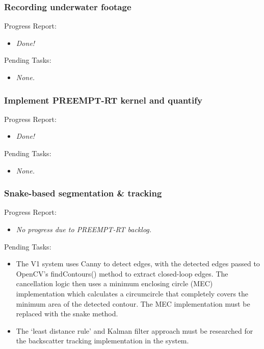 \subsubsection{Recording underwater footage}

Progress Report:

\begin{itemize}
    \item \textit{Done!}
\end{itemize}

Pending Tasks:

\begin{itemize}
    \item \textit{None.}
\end{itemize}




\subsubsection{Implement PREEMPT-RT kernel and quantify}

Progress Report:

\begin{itemize}
    \item \textit{Done!}
\end{itemize}

Pending Tasks:

\begin{itemize}
    \item \textit{None.}
\end{itemize}






\subsubsection{Snake-based segmentation \& tracking}

Progress Report:

\begin{itemize}
    \item \textit{No progress due to PREEMPT-RT backlog.}
\end{itemize}

Pending Tasks:

\begin{itemize}
    \item The V1 system uses Canny to detect edges, with the detected edges passed to OpenCV's findContours() method to extract closed-loop edges. The cancellation logic then uses a minimum enclosing circle (MEC) implementation which calculates a circumcircle that completely covers the minimum area of the detected contour. The MEC implementation must be replaced with the snake method.
    \item The `least distance rule' and Kalman filter approach must be researched for the backscatter tracking implementation in the system.
\end{itemize}
